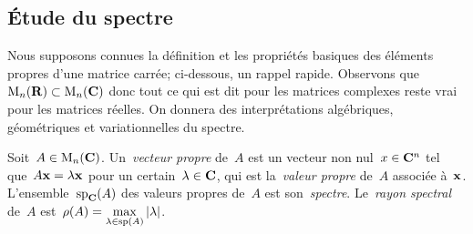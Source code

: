 \subsection{Étude du spectre}

Nous supposons connues la définition et les propriétés basiques des éléments
propres d'une matrice carrée; ci-dessous, un rappel rapide.  Observons
que~$\mathrm{M}_n(\mathbf{R})\subset \mathrm{M}_n(\mathbf{C})$ donc tout ce qui est dit pour les matrices
complexes reste vrai pour les matrices réelles.
On donnera des interprétations algébriques, géométriques et variationnelles
du spectre.

\begin{definition}
	Soit~$A\in\mathrm{M}_n(\mathbf{C})$.  Un~\emph{vecteur propre} de~$A$ est un vecteur non
	nul~$x\in\mathbf{C}^n$ tel que~$A\mathbf{x}=\lambda\mathbf{x}$ pour un certain~$\lambda\in\mathbf{C}$, qui
	est la~\emph{valeur propre} de~$A$ associée à~$\mathbf{x}$.
	L'ensemble~$\mathrm{sp}_{\mathbf{C}}(A)$ des valeurs propres de~$A$ est
	son~\emph{spectre}.  Le~\emph{rayon spectral} de~$A$
	est~$\displaystyle\rho(A)=\max_{\lambda\in\mathrm{sp}(A)}\left|\lambda\right|$.
\end{definition}

